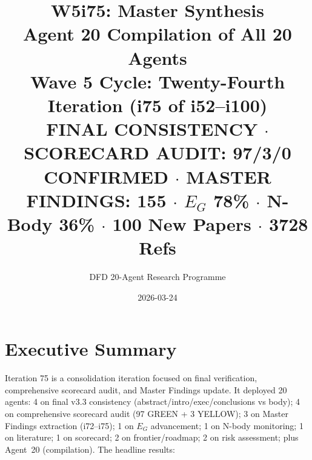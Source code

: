 \documentclass[11pt,a4paper]{article}
\title{\Huge W5i75: Master Synthesis\\[12pt]
\Large Agent 20 Compilation of All 20 Agents\\[6pt]
\large Wave 5 Cycle: Twenty-Fourth Iteration (i75 of i52--i100)\\[6pt]
\normalsize \textbf{FINAL CONSISTENCY} $\cdot$ SCORECARD AUDIT: 97/3/0 CONFIRMED $\cdot$ MASTER FINDINGS: 155 $\cdot$ $E_G$ 78\% $\cdot$ N-Body 36\% $\cdot$ 100 New Papers $\cdot$ 3728 Refs}
\author{DFD 20-Agent Research Programme}
\date{2026-03-24}
\begin{document}
\maketitle

\section{Executive Summary}

Iteration 75 is a consolidation iteration focused on final verification, comprehensive scorecard audit, and Master Findings update. It deployed 20 agents: 4 on final v3.3 consistency (abstract/intro/exec/conclusions vs body); 4 on comprehensive scorecard audit (97 GREEN + 3 YELLOW); 3 on Master Findings extraction (i72--i75); 1 on $E_G$ advancement; 1 on N-body monitoring; 1 on literature; 1 on scorecard; 2 on frontier/roadmap; 2 on risk assessment; plus Agent~20 (compilation). The headline results:
\end{document}
